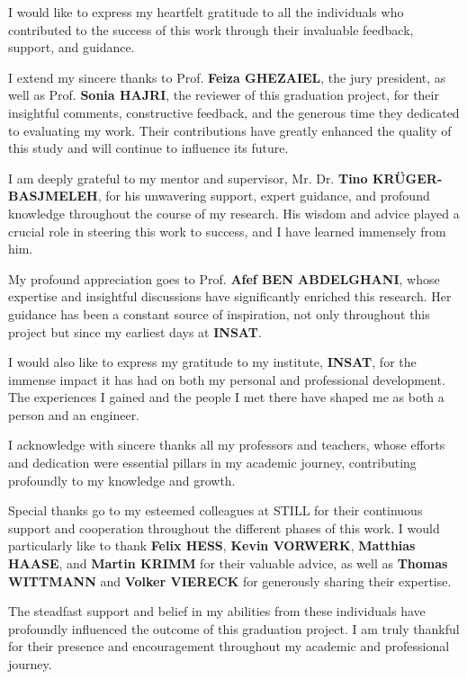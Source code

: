 \begin{acknowledgement}

  I would like to express my heartfelt gratitude to all the individuals who contributed to the success of 
  this work through their invaluable feedback, support, and guidance.

  I extend my sincere thanks to Prof. \textbf{Feiza GHEZAIEL}, the jury president, as well as Prof. 
  \textbf{Sonia HAJRI}, the reviewer of this graduation project, for their insightful comments, constructive 
  feedback, and the generous time they dedicated to evaluating my work. Their contributions have greatly 
  enhanced the quality of this study and will continue to influence its future.
  
  I am deeply grateful to my mentor and supervisor, Mr. Dr. \textbf{Tino KR\"{U}GER-BASJMELEH}, for his 
  unwavering support, expert guidance, and profound knowledge throughout the course of my research. 
  His wisdom and advice played a crucial role in steering this work to success, and I have learned 
  immensely from him.
  
  My profound appreciation goes to Prof. \textbf{Afef BEN ABDELGHANI}, whose expertise and insightful 
  discussions have significantly enriched this research. Her guidance has been a constant source of 
  inspiration, not only throughout this project but since my earliest days at \textbf{INSAT}.
  
  I would also like to express my gratitude to my institute, \textbf{INSAT}, for the immense impact it 
  has had on both my personal and professional development. The experiences I gained and the people I 
  met there have shaped me as both a person and an engineer.
  
  I acknowledge with sincere thanks all my professors and teachers, whose efforts and dedication were 
  essential pillars in my academic journey, contributing profoundly to my knowledge and growth.
  
  Special thanks go to my esteemed colleagues at STILL for their continuous support and cooperation 
  throughout the different phases of this work. I would particularly like to thank \textbf{Felix HESS}, 
  \textbf{Kevin VORWERK}, \textbf{Matthias HAASE}, and \textbf{Martin KRIMM} for their valuable advice, 
  as well as \textbf{Thomas WITTMANN} and \textbf{Volker VIERECK} for generously sharing their expertise.
  
  The steadfast support and belief in my abilities from these individuals have profoundly influenced the 
  outcome of this graduation project. I am truly thankful for their presence and encouragement throughout 
  my academic and professional journey.
  

\end{acknowledgement}

